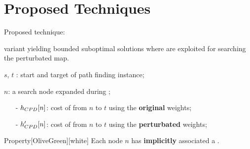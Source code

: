 \section*{Proposed Techniques}

\begin{frame}{Proposed technique: \CPDSearch{}}
    \begin{block}{\CPDSearch{}}
        \A{} variant yielding bounded suboptimal solutions where \CPDPathsName{} are exploited for searching the perturbated map.
    \end{block}

    $s$, $t$ : start and target of path finding instance;
    
    $n$: a search node expanded during \CPDSearch{};

    \begin{block}{}
        \begin{itemize}
            \item[-] $\CPDPathCostOriginal{n}{t}$: cost of \CPDPathName{} from $n$ to $t$ using the \textbf{original} weights;
            \item[-] $\CPDPathCostNew{n}{t}$: cost of \CPDPathName{} from $n$ to $t$ using the \textbf{perturbated} weights;
        \end{itemize} 
    \end{block}

    \begin{coloredBlock}{Property}[OliveGreen][white]
        Each node $n$ has \textbf{implicitly} associated a .
    \end{coloredBlock}
\end{frame}

